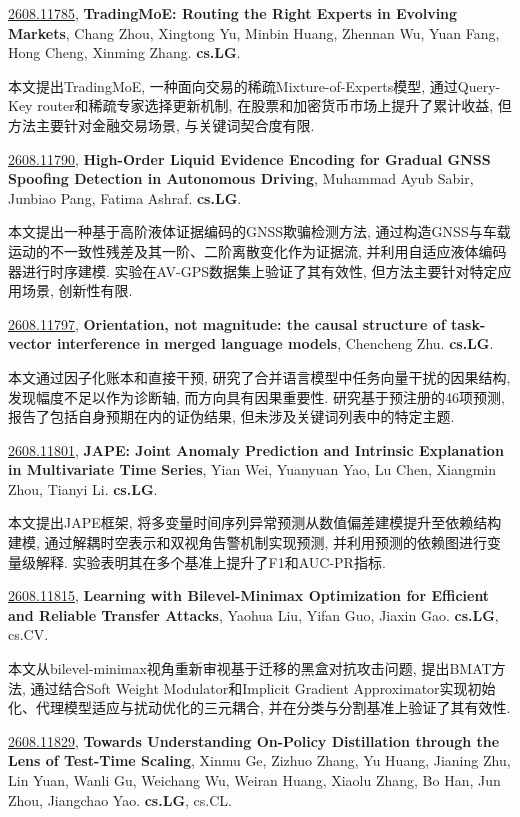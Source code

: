 \documentclass[9pt, a4paper]{article}
\theoremstyle{plain}
\theoremstyle{definition}
\theoremstyle{remark}
\newcommand{\arxivwithtarget}[3]{\hypertarget{#1}{}\href{https://arxiv.org/abs/#1}{#1}, \textbf{\textcolor{arxivblue}{#2}}, #3. }
\begin{document}
\arxivwithtarget{2608.11785}{TradingMoE: Routing the Right Experts in Evolving Markets}{Chang Zhou, Xingtong Yu, Minbin Huang, Zhennan Wu, Yuan Fang, Hong Cheng, Xinming Zhang}\textbf{cs.LG}.

本文提出TradingMoE, 一种面向交易的稀疏Mixture-of-Experts模型, 通过Query-Key router和稀疏专家选择更新机制, 在股票和加密货币市场上提升了累计收益, 但方法主要针对金融交易场景, 与关键词契合度有限.


\arxivwithtarget{2608.11790}{High-Order Liquid Evidence Encoding for Gradual GNSS Spoofing Detection in Autonomous Driving}{Muhammad Ayub Sabir, Junbiao Pang, Fatima Ashraf}\textbf{cs.LG}.

本文提出一种基于高阶液体证据编码的GNSS欺骗检测方法, 通过构造GNSS与车载运动的不一致性残差及其一阶、二阶离散变化作为证据流, 并利用自适应液体编码器进行时序建模. 实验在AV-GPS数据集上验证了其有效性, 但方法主要针对特定应用场景, 创新性有限.


\arxivwithtarget{2608.11797}{Orientation, not magnitude: the causal structure of task-vector interference in merged language models}{Chencheng Zhu}\textbf{cs.LG}.

本文通过因子化账本和直接干预, 研究了合并语言模型中任务向量干扰的因果结构, 发现幅度不足以作为诊断轴, 而方向具有因果重要性. 研究基于预注册的46项预测, 报告了包括自身预期在内的证伪结果, 但未涉及关键词列表中的特定主题.


\arxivwithtarget{2608.11801}{JAPE: Joint Anomaly Prediction and Intrinsic Explanation in Multivariate Time Series}{Yian Wei, Yuanyuan Yao, Lu Chen, Xiangmin Zhou, Tianyi Li}\textbf{cs.LG}.

本文提出JAPE框架, 将多变量时间序列异常预测从数值偏差建模提升至依赖结构建模, 通过解耦时空表示和双视角告警机制实现预测, 并利用预测的依赖图进行变量级解释. 实验表明其在多个基准上提升了F1和AUC-PR指标.


\arxivwithtarget{2608.11815}{Learning with Bilevel-Minimax Optimization for Efficient and Reliable Transfer Attacks}{Yaohua Liu, Yifan Guo, Jiaxin Gao}\textbf{cs.LG}, cs.CV.

本文从bilevel-minimax视角重新审视基于迁移的黑盒对抗攻击问题, 提出BMAT方法, 通过结合Soft Weight Modulator和Implicit Gradient Approximator实现初始化、代理模型适应与扰动优化的三元耦合, 并在分类与分割基准上验证了其有效性.


\arxivwithtarget{2608.11829}{Towards Understanding On-Policy Distillation through the Lens of Test-Time Scaling}{Xinmu Ge, Zizhuo Zhang, Yu Huang, Jianing Zhu, Lin Yuan, Wanli Gu, Weichang Wu, Weiran Huang, Xiaolu Zhang, Bo Han, Jun Zhou, Jiangchao Yao}\textbf{cs.LG}, cs.CL.
\end{document}
